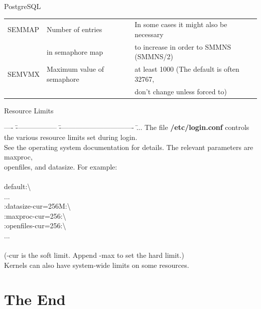 \documentclass[xcolor=dvipsnames]{beamer}
\begin{document}
\begin{frame}{PostgreSQL}
{\begin{center}
\begin{tabular}{| l | l | l | }
		SEMMAP 		& Number of entries 			& In some cases it might also be necessary 	\\
					& in semaphore map				& to increase in order to SMMNS (SMMNS/2)	\\ \hline

		SEMVMX 		& Maximum value of semaphore	& at least 1000 (The default is often 32767,\\
					& 								& don't change unless forced to)			\\ \hline

	\end{tabular}
	\end{center}
	}
	\end{frame}

	\begin{frame}{Resource Limits}
	\scriptsize
	{
	\begin{tabbing}
	---- \= ------------------ \= -------------------------------- \= ... \kill
	The file \textbf{/etc/login.conf} controls the various resource limits set during login.\\
	See the operating system documentation for details. The relevant parameters are maxproc, \\
	openfiles, and datasize. For example: \\ \\
	
	\>default:\textbackslash \\
	\>... \\
	\>\>	:datasize-cur=256M:\textbackslash \\
	\>\>	:maxproc-cur=256:\textbackslash \\ 
    \>\>	:openfiles-cur=256:\textbackslash \\
	\>... \\ \\

	(-cur is the soft limit. Append -max to set the hard limit.) \\
	Kernels can also have system-wide limits on some resources.  \\
	\end{tabbing}
	}
	\end{frame}


\section{The End}
\end{document}
